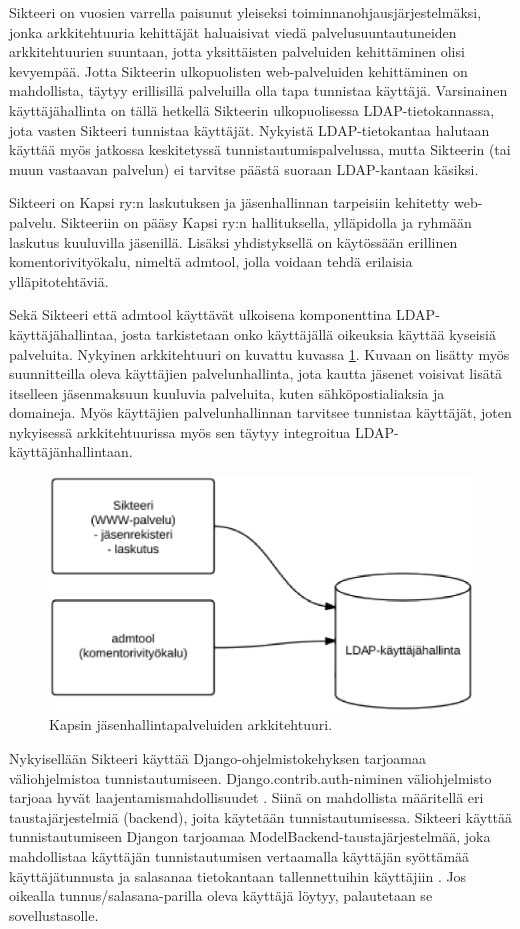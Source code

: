 Sikteeri on vuosien varrella paisunut yleiseksi toiminnanohjausjärjestelmäksi, jonka arkkitehtuuria kehittäjät haluaisivat viedä palvelusuuntautuneiden arkkitehtuurien suuntaan, jotta yksittäisten palveluiden kehittäminen olisi kevyempää. Jotta Sikteerin ulkopuolisten web-palveluiden kehittäminen on mahdollista, täytyy erillisillä palveluilla olla tapa tunnistaa käyttäjä. Varsinainen käyttäjähallinta on tällä hetkellä Sikteerin ulkopuolisessa LDAP-tietokannassa, jota vasten Sikteeri tunnistaa käyttäjät. Nykyistä LDAP-tietokantaa halutaan käyttää myös jatkossa keskitetyssä tunnistautumispalvelussa, mutta Sikteerin (tai muun vastaavan palvelun) ei tarvitse päästä suoraan LDAP-kantaan käsiksi.

Sikteeri on Kapsi ry:n laskutuksen ja jäsenhallinnan tarpeisiin kehitetty web-palvelu. Sikteeriin on pääsy Kapsi ry:n hallituksella, ylläpidolla ja ryhmään laskutus kuuluvilla jäsenillä. Lisäksi yhdistyksellä on käytössään erillinen komentorivityökalu, nimeltä admtool, jolla voidaan tehdä erilaisia ylläpitotehtäviä.

Sekä Sikteeri että admtool käyttävät ulkoisena komponenttina LDAP-käyt\-tä\-jä\-hal\-lin\-taa, josta tarkistetaan onko käyttäjällä oikeuksia käyttää kyseisiä palveluita. Nykyinen arkkitehtuuri on kuvattu kuvassa \ref{kapsi_nykyinen}. Kuvaan on lisätty myös suunnitteilla oleva käyttäjien palvelunhallinta, jota kautta jäsenet voisivat lisätä itselleen jäsenmaksuun kuuluvia palveluita, kuten sähköpostialiaksia ja domaineja. Myös käyttäjien palvelunhallinnan tarvitsee tunnistaa käyttäjät, joten nykyisessä arkkitehtuurissa myös sen täytyy integroitua LDAP-käyttäjänhallintaan.

\begin{figure}[h]
\centering
\includegraphics[width=.7\textwidth]{toteutus/kapsi_nykyinen.eps}
\caption{Kapsin jäsenhallintapalveluiden arkkitehtuuri.}%
\label{kapsi_nykyinen}
\end{figure}

Nykyisellään Sikteeri käyttää Django-ohjelmistokehyksen tarjoamaa väliohjelmistoa tunnistautumiseen. Django.contrib.auth-niminen väliohjelmisto tarjoaa hyvät laajentamismahdollisuudet \cite{django_auth}. Siinä on mahdollista määritellä eri taustajärjestelmiä (backend), joita käytetään tunnistautumisessa. Sikteeri käyttää tunnistautumiseen Djangon tarjoamaa ModelBackend-taustajärjestelmää, joka mahdollistaa käyttäjän tunnistautumisen vertaamalla käyttäjän syöttämää käyttäjätunnusta ja salasanaa tietokantaan tallennettuihin käyttäjiin \cite{django_auth}. Jos oikealla tunnus/salasana-parilla oleva käyttäjä löytyy, palautetaan se sovellustasolle.